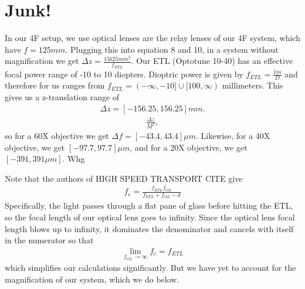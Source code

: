 \section{Junk!}
In our 4F setup, we use optical lenses are the relay lenses of our 4F system, which have $f = 125mm$. Plugging this into equation 8 and 10, in a system without magnification we get $\Delta z = \frac{15625 mm^2}{f_{ETL}}.$ Our ETL (Optotune 10-40) has an effective focal power range of -10 to 10 diopters. Dioptric power is given by $f_{ETL} = \frac{1m}{D}$ and therefore for us ranges from $f_{ETL} = (-\infty, -10]\cup [100, \infty)$ millimeters. This gives us a z-translation range of
\begin{gather}
	\Delta z = [-156.25, 156.25]mm.
\end{gather}
\begin{gather}
	\frac{\Delta z}{M^2},
\end{gather} 
so for a 60X objective we get $\Delta f = [-43.4, 43.4] \mu m$. Likewise, for a 40X objective, we get $[-97.7, 97.7] \mu m$, and for a 20X objective, we get $[-391, 391 \mu m]$. Whg %

Note that the authors of {HIGH SPEED TRANSPORT CITE} give
\begin{gather}
	f_e = \frac{f_{ETL}f_{OL}}{f_{ETL}+f_{OL}-d}
\end{gather}
 Specifically, the light passes through a flat pane of glass before hitting the ETL, so the focal length of our optical lens goes to infinity. Since the optical lens focal length blows up to infinity, it dominates the denominator and cancels with itself in the numerator so that
\begin{gather}
	 \lim_{f_{OL} \to \infty} f_c = f_{ETL}
\end{gather}
which simplifies our calculations significantly. But we have yet to account for the magnification of our system, which we do below.
\newpage
